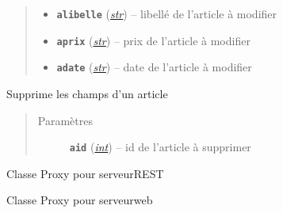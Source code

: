 \documentclass[letterpaper,10pt,french]{sphinxmanual}
\begin{document}
\begin{fulllineitems}
\begin{fulllineitems}
\begin{quote}
\begin{description}
\begin{itemize}
\item {} 
\textbf{\texttt{alibelle}} (\href{https://docs.python.org/library/functions.html\#str}{\emph{str}}) -- libellé de l'article à modifier

\item {} 
\textbf{\texttt{aprix}} (\href{https://docs.python.org/library/functions.html\#str}{\emph{str}}) -- prix de l'article à modifier

\item {} 
\textbf{\texttt{adate}} (\href{https://docs.python.org/library/functions.html\#str}{\emph{str}}) -- date de l'article à modifier

\end{itemize}

\end{description}\end{quote}

\end{fulllineitems}


\begin{fulllineitems}
\label{proxy:proxy.Proxy.supprimerArticle}
Supprime les champs d'un article
\begin{quote}\begin{description}
\item[{Paramètres}] \leavevmode
\textbf{\texttt{aid}} (\href{https://docs.python.org/library/functions.html\#int}{\emph{int}}) -- id de l'article à supprimer

\end{description}\end{quote}

\end{fulllineitems}


\end{fulllineitems}


\begin{fulllineitems}
\label{proxy:proxy.ProxyREST}
Classe Proxy pour serveurREST

\end{fulllineitems}


\begin{fulllineitems}
\label{proxy:proxy.ProxyWeb}
Classe Proxy pour serveurweb

\end{fulllineitems}
\end{document}
